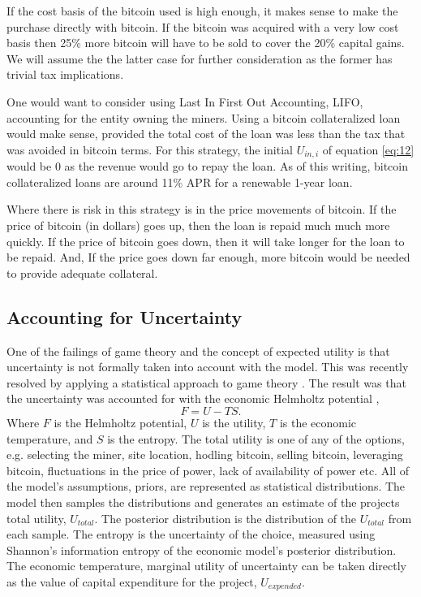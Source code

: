 \documentclass[runningheads]{llncs}
\begin{document}
If the cost basis of the bitcoin used is high enough, it makes sense to make the purchase directly with bitcoin.
If the bitcoin was acquired with a very low cost basis then 25\% more bitcoin will have to be sold to cover the 20\% capital gains.
We will assume the the latter case for further consideration as the former has trivial tax implications.

One would want to consider using Last In First Out Accounting, LIFO, accounting for the entity owning the miners.
Using a bitcoin collateralized loan would make sense, provided the total cost of the loan was less than the tax that was avoided in bitcoin terms.
For this strategy, the initial $U_{in,i}$ of equation \ref{eq:12} would be 0 as the revenue would go to repay the loan.
As of this writing, bitcoin collateralized loans are around 11\% APR for a renewable 1-year loan.

Where there is risk in this strategy is in the price movements of bitcoin.
If the price of bitcoin (in dollars) goes up, then the loan is repaid much much more quickly.
If the price of bitcoin goes down, then it will take longer for the loan to be repaid.
And, If the price goes down far enough, more bitcoin would be needed to provide adequate collateral.

\subsection{Accounting for Uncertainty}
One of the failings of game theory and the concept of expected utility is that uncertainty is not formally taken into account with the model.
This was recently resolved by applying a statistical approach to game theory \cite{abel2021entropy}.
The result was that the uncertainty was accounted for with the economic Helmholtz potential \cite{abel2021entropy},
\begin{equation}
    F = U - T S. \label{eq:13}
\end{equation}
Where $F$ is the Helmholtz potential, $U$ is the utility, $T$ is the economic temperature, and $S$ is the entropy.
The total utility is one of any of the options, e.g. selecting the miner, site location, hodling bitcoin, selling bitcoin, leveraging bitcoin, fluctuations in the price of power, lack of availability of power etc.
All of the model's assumptions, priors, are represented as statistical distributions.
The model then samples the distributions and generates an estimate of the projects total utility, $U_{total}$.
The posterior distribution is the distribution of the $U_{total}$ from each sample.
The entropy is the uncertainty of the choice, measured using Shannon's information entropy of the economic model's posterior distribution.
The economic temperature, marginal utility of uncertainty can be taken directly as the value of capital expenditure for the project, $U_{expended}$.
\end{document}
